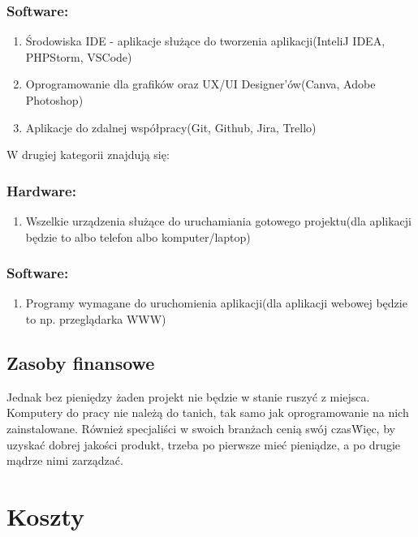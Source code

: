\documentclass[a4paper,12pt]{article}
\begin{document}
    \subsubsection{Software:}
    \begin{enumerate}
        \item Środowiska IDE - aplikacje służące do tworzenia aplikacji(InteliJ IDEA, PHPStorm, VSCode)
        \item Oprogramowanie dla grafików oraz UX/UI Designer'ów(Canva, Adobe Photoshop)
        \item Aplikacje do zdalnej współpracy(Git, Github, Jira, Trello)
    \end{enumerate}
    W drugiej kategorii znajdują się:
    \subsubsection{Hardware:}
    \begin{enumerate}
        \item Wszelkie urządzenia służące do uruchamiania gotowego projektu(dla aplikacji będzie to albo telefon albo komputer/laptop)
    \end{enumerate}
    \subsubsection{Software:}
    \begin{enumerate}
        \item Programy wymagane do uruchomienia aplikacji(dla aplikacji webowej będzie to np. przeglądarka WWW)
    \end{enumerate}

    \subsection{Zasoby finansowe}\label{subsec:zasoby-finansowe}
    Jednak bez pieniędzy żaden projekt nie będzie w stanie ruszyć z miejsca. Komputery do pracy nie należą do tanich,
    tak samo jak oprogramowanie na nich zainstalowane. Również specjaliści w swoich branżach cenią swój czas\. Więc,
    by uzyskać dobrej jakości produkt, trzeba po pierwsze mieć pieniądze, a po drugie mądrze nimi zarządzać.

    \newpage

\section{Koszty}\label{sec:koszty}
\end{document}

